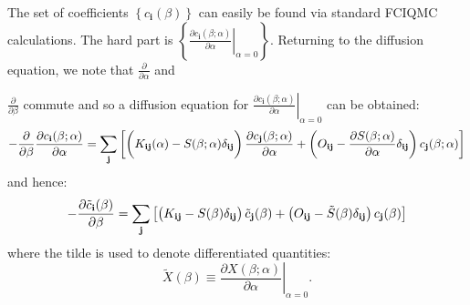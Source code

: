 \documentclass[a4paper, 11pt]{article}
\newcommand{\bi}{\mathbf{i}}
\newcommand{\bj}{\mathbf{j}}
\newcommand{\dd}[2]{\frac{\partial#1}{\partial#2}}
\begin{document}
The set of coefficients $\left\{c_\bi(\beta)\right\}$ can easily be found via standard FCIQMC calculations.  The hard part is 
$\left\{\left.\dd{c_\bi(\beta;\alpha)}{\alpha}\right|_{\alpha=0}\right\}$.  Returning to the diffusion equation, we note that $\dd{}{\alpha}$ and {$\dd{}{\beta}$ commute and so a diffusion equation for $\left.\dd{c_\bi(\beta;\alpha)}{\alpha}\right|_{\alpha=0}$ can be obtained:
\begin{equation}
- \dd{}{\beta} \dd{c_\bi(\beta;\alpha)}{\alpha} = 
\sum_\bj \left[ \left(K_{\bi\bj}(\alpha) - S(\beta;\alpha) \delta_{\bi\bj}\vphantom{\dd{}{}}\right) \dd{c_\bj(\beta;\alpha)}{\alpha} + \left(O_{\bi\bj} - \dd{S(\beta;\alpha)}{\alpha} \delta_{\bi\bj}\right) c_\bj(\beta;\alpha) \right]
\end{equation}
and hence:
\begin{equation}
- \dd{\tilde{c}_\bi(\beta)}{\beta} = \sum_\bj \left[ \left(K_{\bi\bj} - S(\beta) \delta_{\bi\bj}\vphantom{\tilde{S}}\right) \tilde{c}_\bj(\beta) + \left(O_{\bi\bj} - \tilde{S}(\beta) \delta_{\bi\bj}\right) c_\bj(\beta) \right]
\end{equation}
where the tilde is used to denote differentiated quantities:
\begin{equation}
\tilde{X}(\beta) \equiv \left.\dd{X(\beta;\alpha)}{\alpha}\right|_{\alpha=0}.
\end{equation}

}
\end{document}
